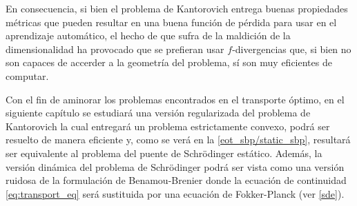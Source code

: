 En consecuencia, si bien el problema de Kantorovich entrega buenas propiedades métricas que pueden resultar en una buena función de pérdida para usar en el aprendizaje automático, el hecho de que sufra de la maldición de la dimensionalidad ha provocado que se prefieran usar $f$-divergencias que, si bien no son capaces de accerder a la geometría del problema, sí son muy eficientes de computar.

Con el fin de aminorar los problemas encontrados en el transporte óptimo, en el siguiente capítulo se estudiará una versión regularizada del problema de Kantorovich la cual entregará un problema estrictamente convexo, podrá ser resuelto de manera eficiente y, como se verá en la \autoref{eot_sbp/static_sbp}, resultará ser equivalente al problema del puente de Schrödinger estático. Además, la versión dinámica del problema de Schrödinger podrá ser vista como una versión ruidosa de la formulación de Benamou-Brenier donde la ecuación de continuidad \eqref{eq:transport_eq} será sustituida por una ecuación de Fokker-Planck (ver \autoref{sde}).